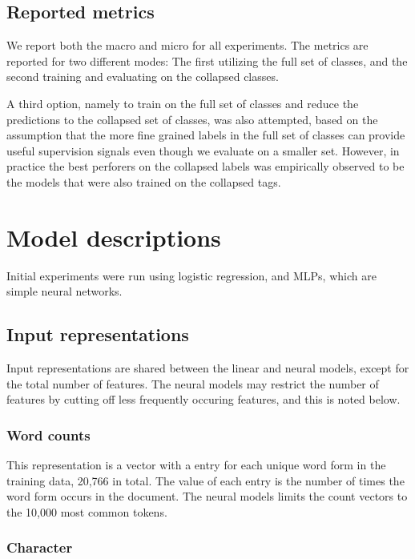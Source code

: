 \subsection{Reported metrics}

We report both the macro and micro \FI for all experiments. The metrics are
reported for two different modes: The first utilizing the full set of
classes, and the second training and evaluating on the collapsed classes.

A third option, namely to train on the full set of classes and reduce the
predictions to the collapsed set of classes, was also attempted, based on the
assumption that the more fine grained labels in the full set of classes can
provide useful supervision signals even though we evaluate on a smaller set.
However, in practice the best perforers on the collapsed labels was
empirically observed to be the models that were also trained on the collapsed
tags.


\section{Model descriptions}

Initial experiments were run using logistic regression, and \acp{MLP}, which
are simple neural networks.

\subsection{Input representations}

Input representations are shared between the linear and neural models, except
for the total number of features. The neural models may restrict the number
of features by cutting off less frequently occuring features, and this is
noted below.

\subsubsection*{Word counts}

This representation is a vector with a entry for each unique word form in the
training data, 20,766 in total. The value of each entry is the number of
times the word form occurs in the document. The neural models limits the
count vectors to the 10,000 most common tokens.

\subsubsection*{Character \ngrams}

